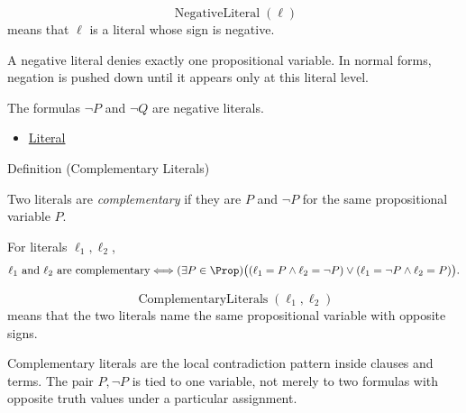 \begin{remark*}
\[
\operatorname{NegativeLiteral}(\ell)
\]
means that \(\ell\) is a literal whose sign is negative.
\end{remark*}

\begin{remark*}[Interpretation]
A negative literal denies exactly one propositional variable. In normal forms,
negation is pushed down until it appears only at this literal level.
\end{remark*}

\begin{remark*}[Examples]
The formulas \(\neg P\) and \(\neg Q\) are negative literals.
\end{remark*}

\begin{dependencies}
\begin{itemize}
  \item \hyperref[def:literal-propositional-logic]{Literal}
\end{itemize}
\end{dependencies}

\begin{definitionbox}{Definition (Complementary Literals)}
\begin{definition}
\label{def:complementary-literals-propositional-logic}
Two literals are \emph{complementary} if they are \(P\) and \(\neg P\) for the
same propositional variable \(P\).
\end{definition}
\end{definitionbox}

\begin{remark*}
For literals \(\ell_1,\ell_2\),
\[
\ell_1\text{ and }\ell_2\text{ are complementary}
\Longleftrightarrow
(\exists P\in\Prop)
\bigl((\ell_1=P\land \ell_2=\neg P)
\lor
(\ell_1=\neg P\land \ell_2=P)\bigr).
\]
\end{remark*}

\begin{remark*}
\[
\operatorname{ComplementaryLiterals}(\ell_1,\ell_2)
\]
means that the two literals name the same propositional variable with opposite
signs.
\end{remark*}

\begin{remark*}[Interpretation]
Complementary literals are the local contradiction pattern inside clauses and
terms. The pair \(P,\neg P\) is tied to one variable, not merely to two formulas
with opposite truth values under a particular assignment.
\end{remark*}

